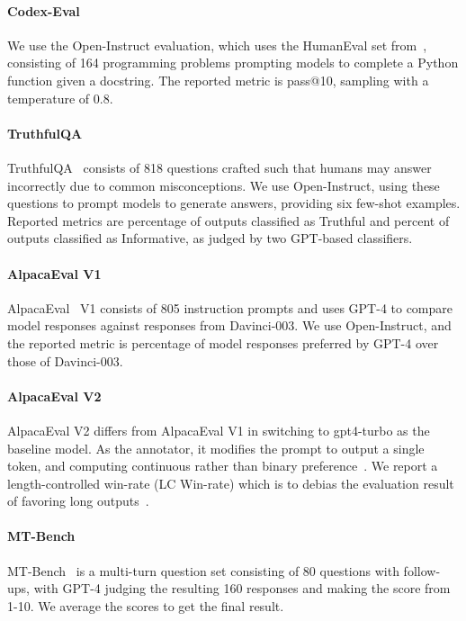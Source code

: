 \paragraph{Codex-Eval} We use the Open-Instruct evaluation, which uses the HumanEval set from~\citet{chen2021evaluating}, consisting of 164 programming problems prompting models to complete a Python function given a docstring. The reported metric is pass@10, sampling with a temperature of 0.8.


\paragraph{TruthfulQA} TruthfulQA~\citep{lin2022truthfulqa} consists of 818 questions crafted such that humans may answer incorrectly due to common misconceptions. We use Open-Instruct, using these questions to prompt models to generate answers, providing six few-shot examples. Reported metrics are percentage of outputs classified as Truthful and percent of outputs classified as Informative, as judged by two GPT-based classifiers.


\paragraph{AlpacaEval V1} AlpacaEval~\citep{alpaca_eval} V1 consists of 805 instruction prompts and uses GPT-4 to compare model responses against responses from Davinci-003. We use Open-Instruct, and the reported metric is percentage of model responses preferred by GPT-4 over those of Davinci-003.


\paragraph{AlpacaEval V2} AlpacaEval V2 differs from AlpacaEval V1 in switching to gpt4-turbo as the baseline model. As the annotator, it modifies the prompt to output a single token, and computing continuous rather than binary preference~\citep{alpaca_eval}. We report a length-controlled win-rate (LC Win-rate) which is to debias the evaluation result of favoring long outputs~\cite{dubois2024lengthcontrolled}.


\paragraph{MT-Bench} MT-Bench~\citep{zheng2023judging} is a multi-turn question set consisting of 80 questions with follow-ups, with GPT-4 judging the resulting 160 responses and making the score from 1-10. We average the scores to get the final result.


